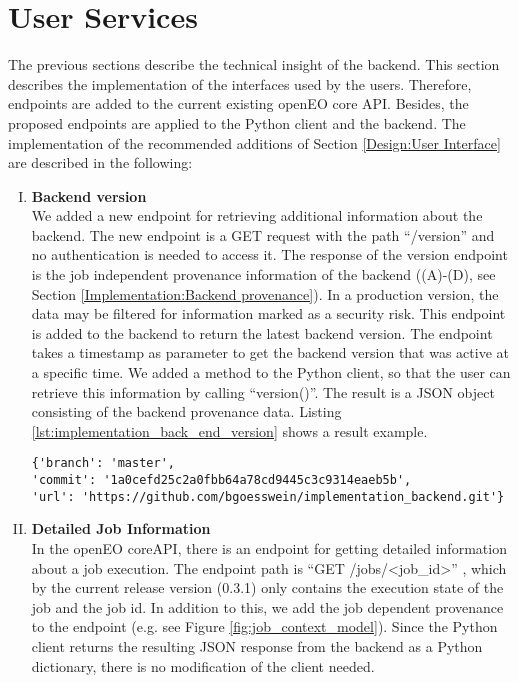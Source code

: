 \documentclass[draft,final]{vutinfth} %
\begin{document}
\section{User Services}\label{Implementation:User Interface}
The previous sections describe the technical insight of the backend. This section describes the implementation of the interfaces used by the users. Therefore, endpoints are added to the current existing openEO core API. Besides, the proposed endpoints are applied to the Python client and the backend. The implementation of the recommended additions of Section \ref{Design:User Interface} are described in the following:

\begin{enumerate}[I.]
\item \textbf{Backend version} \\
	We added a new endpoint for retrieving additional information about the backend. The new endpoint is a GET request with the path “/version” and no authentication is needed to access it. The response of the version endpoint is the job independent provenance information of the backend ((A)-(D), see Section \ref{Implementation:Backend provenance}). In a production version, the data may be filtered for information marked as a security risk. This endpoint is added to the backend to return the latest backend version. The endpoint takes a timestamp as parameter to get the backend version that was active at a specific time. We added a method to the Python client, so that the user can retrieve this information by calling “version()”. The result is a JSON object consisting of the backend provenance data. Listing \ref{lst:implementation_back_end_version} shows a result example.

\begin{listing}[ht]
	\begin{verbatim}
{'branch': 'master',
'commit': '1a0cefd25c2a0fbb64a78cd9445c3c9314eaeb5b',
'url': 'https://github.com/bgoesswein/implementation_backend.git'}
	\end{verbatim}
	\caption{Backend version example.}
	\label{lst:implementation_back_end_version}
\end{listing}

\item \textbf{Detailed Job Information} \\
	In the openEO coreAPI, there is an endpoint for getting detailed information about a job execution. The endpoint path is “GET /jobs/<job\_id>” , which by the current release version (0.3.1) only contains the execution state of the job and the job id. In addition to this, we add the job dependent provenance to the endpoint (e.g. see Figure \ref{fig:job_context_model}). Since the Python client returns the resulting JSON response from the backend as a Python dictionary, there is no modification of the client needed.


\end{enumerate}
\end{document}
